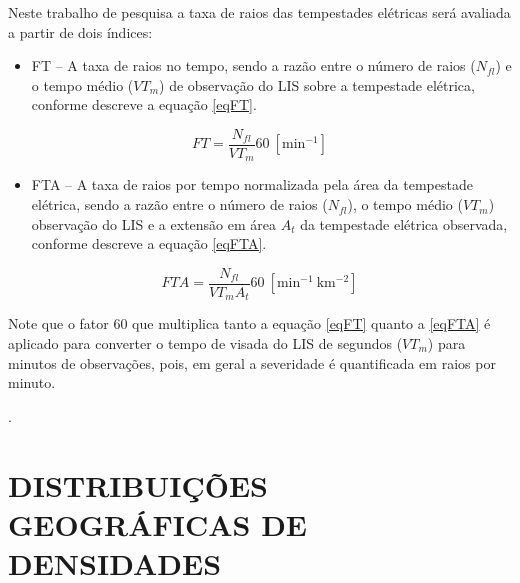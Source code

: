 Neste trabalho de pesquisa a taxa de raios das tempestades elétricas será avaliada a partir de dois índices:

\begin{itemize}
\item FT -- A taxa de raios no tempo, sendo a razão entre o número de raios ($N_{fl}$) e o tempo médio ($VT_m$) de observação do LIS sobre a tempestade elétrica, conforme descreve a equação \ref{eqFT}.
\end{itemize}

\begin{equation}
FT = \frac{N_{fl} }{VT_m} 60 ~[\mathrm{min^{-1}}]  
\label{eqFT}  
\end{equation}

\begin{itemize}
\item FTA -- A taxa de raios por tempo normalizada pela área da tempestade elétrica, sendo a razão entre o número de raios ($N_{fl}$), o tempo médio ($VT_m$) observação do LIS e a extensão em área $A_t$ da tempestade elétrica observada, conforme descreve a equação \ref{eqFTA}.
\end{itemize}

\begin{equation}
FTA = \frac{N_{fl} }{VT_m A_t } 60 ~[\mathrm{min^{-1}~km^{-2}}]
\label{eqFTA}
\end{equation}



Note que o fator 60 que multiplica tanto a equação \ref{eqFT} quanto a \ref{eqFTA} é aplicado para converter o tempo de visada do LIS de segundos ($VT_m$) para minutos de observações, pois, em geral a severidade é quantificada em raios por minuto.


 .

\section{DISTRIBUIÇÕES GEOGRÁFICAS DE DENSIDADES}
\label{metodoPass}

